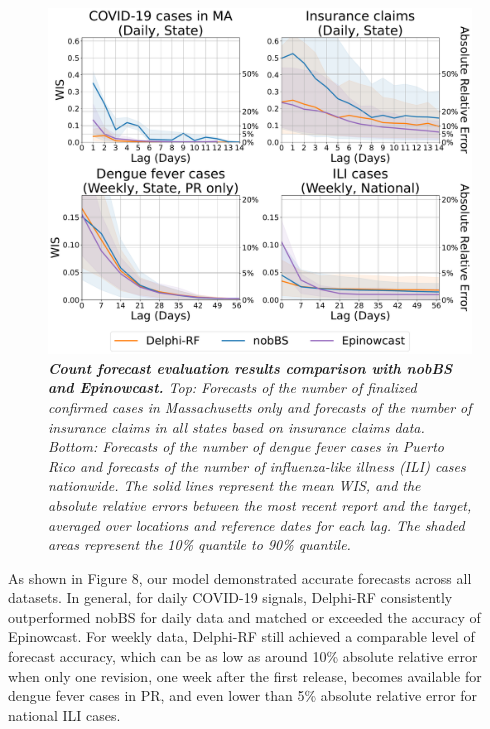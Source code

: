 \begin{figure}[h!]
    \centering
    \includegraphics[width=\textwidth]{figs/experiment_count_result_evl_general_for_comparison.pdf}
    \caption{\emph{\textbf{Count forecast evaluation results comparison with nobBS and Epinowcast.} Top: Forecasts of the number of finalized confirmed cases in Massachusetts only and forecasts of the number of insurance claims in all states based on insurance claims data. Bottom: Forecasts of the number of dengue fever cases in Puerto Rico and forecasts of the number of influenza-like illness (ILI) cases nationwide. The solid lines represent the mean WIS, and the absolute relative errors between the most recent report and the target, averaged over locations and reference dates for each lag. The shaded areas represent the 10\% quantile to 90\% quantile.}}
\end{figure}

As shown in Figure 8, our model demonstrated accurate forecasts across all datasets. In general, for daily COVID-19 signals, Delphi-RF consistently outperformed nobBS for daily data and matched or exceeded the accuracy of Epinowcast. For weekly data, Delphi-RF still achieved a comparable level of forecast accuracy, which can be as low as around 10\% absolute relative error when only one revision, one week after the first release, becomes available for dengue fever cases in PR, and even lower than 5\% absolute relative error for national ILI cases.

